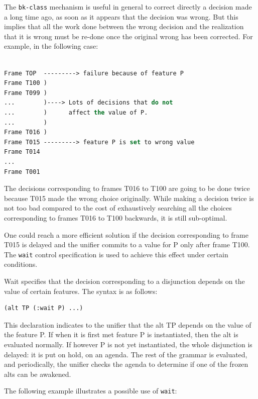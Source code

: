 \documentclass[10pt,a4paper]{report}
\begin{document}
The {\tt bk-class} mechanism is useful in general to correct directly a
decision made a long time ago, as soon as it appears that the decision was
wrong.  But this implies that all the work done between the wrong decision
and the realization that it is wrong must be re-done once the original
wrong has been corrected.  For example, in the following case:

\begin{lstlisting}[language=Lisp]

Frame TOP  ---------> failure because of feature P
Frame T100 )
Frame T099 )
...        )----> Lots of decisions that do not 
...        )      affect the value of P.
...        )
Frame T016 )
Frame T015 ---------> feature P is set to wrong value
Frame T014
...
Frame T001 

\end{lstlisting}


The decisions corresponding to frames T016 to T100 are going to be done
twice because T015 made the wrong choice originally.  While making a
decision twice is not too bad compared to the cost of exhaustively
searching all the choices corresponding to frames T016 to T100 backwards,
it is still sub-optimal.

One could reach a more efficient solution if the decision corresponding to
frame T015 is delayed and the unifier commits to a value for P only after
frame T100.  The {\tt wait} control specification is used to achieve this
effect under certain conditions.

Wait specifies that the decision corresponding to a disjunction depends on
the value of certain features.  The syntax is as follows:

\begin{lstlisting}[language=Lisp]
(alt TP (:wait P) ...)
\end{lstlisting}

This declaration indicates to the unifier that the alt TP depends on the
value of the feature P.  If when it is first met feature P is instantiated,
then the alt is evaluated normally.  If however P is not yet instantiated,
the whole disjunction is delayed: it is put on hold, on an agenda.  The
rest of the grammar is evaluated, and periodically, the unifier checks the
agenda to determine if one of the frozen alts can be awakened.  

The following example illustrates a possible use of {\tt wait}:
\end{document}
